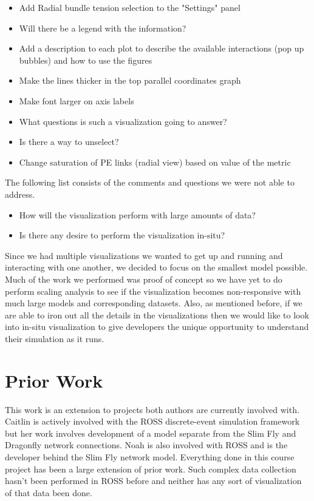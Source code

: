\documentclass{acm_proc_article-sp}
\begin{document}
\begin{itemize}
\item Add Radial bundle tension selection to the "Settings" panel
\item Will there be a legend with the information?
\item Add a description to each plot to describe the available interactions (pop up bubbles) and how to use the figures
\item Make the lines thicker in the top parallel coordinates graph
\item Make font larger on axis labels
\item What questions is such a visualization going to answer?
\item Is there a way to unselect?
\item Change saturation of PE links (radial view) based on value of the metric
\end{itemize}

The following list consists of the comments and questions we were not able to address.

\begin{itemize}
\item How will the visualization perform with large amounts of data?
\item Is there any desire to perform the visualization in-situ?
\end{itemize}

Since we had multiple visualizations we wanted to get up and running and interacting with one another, we decided to focus on the smallest model possible. Much of the work we performed was proof of concept so we have yet to do perform scaling analysis to see if the visualization becomes non-responsive with much large models and corresponding datasets. Also, as mentioned before, if we are able to iron out all the details in the visualizations then we would like to look into in-situ visualization to give developers the unique opportunity to understand their simulation as it runs. 

\section{Prior Work}
This work is an extension to projects both authors are currently involved with. Caitlin is actively involved with the ROSS discrete-event simulation framework but her work involves development of a model separate from the Slim Fly and Dragonfly network connections. Noah is also involved with ROSS and is the developer behind the Slim Fly network model. Everything done in this course project has been a large extension of prior work. Such complex data collection hasn't been performed in ROSS before and neither has any sort of visualization of that data been done. 
\end{document}

